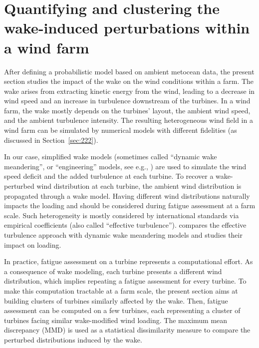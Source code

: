 \section{Quantifying and clustering the wake-induced perturbations within a wind farm}

After defining a probabilistic model based on ambient metocean data, the present section studies the impact of the wake on the wind conditions within a farm. 
The wake arises from extracting kinetic energy from the wind, leading to a decrease in wind speed and an increase in turbulence downstream of the turbines. 
In a wind farm, the wake mostly depends on the turbines' layout, the ambient wind speed, and the ambient turbulence intensity. 
The resulting heterogeneous wind field in a wind farm can be simulated by numerical models with different fidelities (as discussed in Section~\ref{sec:222}). 

In our case, simplified wake models (sometimes called ``dynamic wake meandering'', or ``engineering'' models, see e.g., \citealp{doubrawa_2020_benchmark}) are used to simulate the wind speed deficit and the added turbulence at each turbine.
To recover a wake-perturbed wind distribution at each turbine, the ambient wind distribution is propagated through a wake model. 
Having different wind distributions naturally impacts the loading and should be considered during fatigue assessment at a farm scale. 
Such heterogeneity is mostly considered by international standards via empirical coefficients (also called ``effective turbulence''). 
\citet{doubrawa_2023} compares the effective turbulence approach with dynamic wake meandering models and studies their impact on loading. 

In practice, fatigue assessment on a turbine represents a computational effort. 
As a consequence of wake modeling, each turbine presents a different wind distribution, which implies repeating a fatigue assessment for every turbine. 
To make this computation tractable at a farm scale, the present section aims at building clusters of turbines similarly affected by the wake. 
Then, fatigue assessment can be computed on a few turbines, each representing a cluster of turbines facing similar wake-modified wind loading. 
The maximum mean discrepancy (MMD) is used as a statistical dissimilarity measure to compare the perturbed distributions induced by the wake. 

